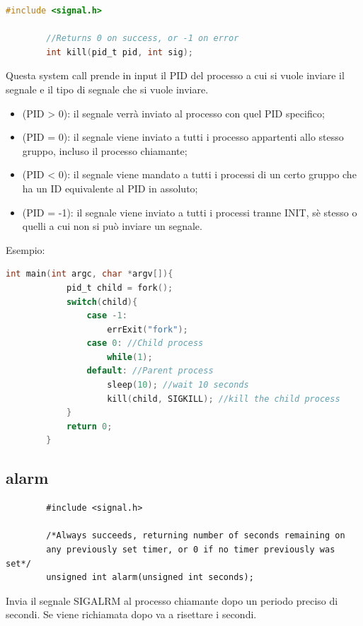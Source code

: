 \documentclass[a4paper, 12pt]{book}
\begin{document}
    \begin{lstlisting}[language=C]
        #include <signal.h>

        //Returns 0 on success, or -1 on error 
        int kill(pid_t pid, int sig);
    \end{lstlisting}
    Questa system call prende in input il PID del processo 
    a cui si vuole inviare il segnale e il tipo di segnale che 
    si vuole inviare. 
    \begin{itemize}
        \item (PID > 0): il segnale verrà inviato al processo con quel PID specifico;
        \item (PID = 0): il segnale viene inviato a tutti i processo appartenti allo stesso gruppo, incluso il processo chiamante;
        \item (PID < 0): il segnale viene mandato a tutti i processi di un certo gruppo che ha un ID equivalente al PID in assoluto;
        \item (PID = -1): il segnale viene inviato a tutti i processi tranne INIT, sè stesso o quelli a cui non si può inviare un segnale.
    \end{itemize}
    Esempio:
    \begin{lstlisting}[language=C]
        int main(int argc, char *argv[]){
            pid_t child = fork();
            switch(child){
                case -1:
                    errExit("fork");
                case 0: //Child process 
                    while(1);
                default: //Parent process 
                    sleep(10); //wait 10 seconds 
                    kill(child, SIGKILL); //kill the child process
            }
            return 0;
        }
    \end{lstlisting}
    
    \subsection{alarm}

    \begin{lstlisting}
        #include <signal.h>

        /*Always succeeds, returning number of seconds remaining on 
        any previously set timer, or 0 if no timer previously was set*/ 
        unsigned int alarm(unsigned int seconds);
    \end{lstlisting}
    Invia il segnale SIGALRM al processo chiamante dopo un 
    periodo preciso di secondi. Se viene richiamata dopo 
    va a risettare i secondi.
\end{document}
